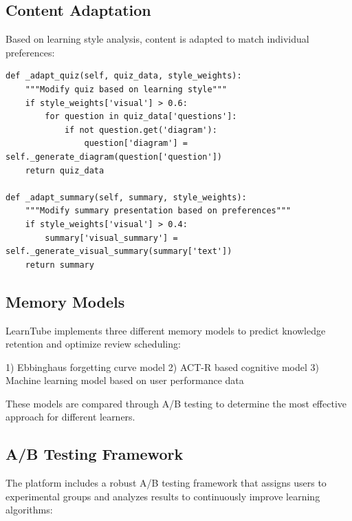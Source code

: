 \documentclass[conference]{IEEEtran}
\begin{document}
\subsection{Content Adaptation}
Based on learning style analysis, content is adapted to match individual preferences:

\begin{verbatim}
def _adapt_quiz(self, quiz_data, style_weights):
    """Modify quiz based on learning style"""
    if style_weights['visual'] > 0.6:
        for question in quiz_data['questions']:
            if not question.get('diagram'):
                question['diagram'] = self._generate_diagram(question['question'])
    return quiz_data

def _adapt_summary(self, summary, style_weights):
    """Modify summary presentation based on preferences"""
    if style_weights['visual'] > 0.4:
        summary['visual_summary'] = self._generate_visual_summary(summary['text'])
    return summary
\end{verbatim}

\subsection{Memory Models}
LearnTube implements three different memory models to predict knowledge retention and optimize review scheduling:

1) Ebbinghaus forgetting curve model
2) ACT-R based cognitive model 
3) Machine learning model based on user performance data

These models are compared through A/B testing to determine the most effective approach for different learners.

\subsection{A/B Testing Framework}
The platform includes a robust A/B testing framework that assigns users to experimental groups and analyzes results to continuously improve learning algorithms:
\end{document}
